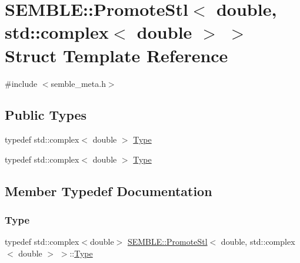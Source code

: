 \hypertarget{structSEMBLE_1_1PromoteStl_3_01double_00_01std_1_1complex_3_01double_01_4_01_4}{}\section{S\+E\+M\+B\+LE\+:\+:Promote\+Stl$<$ double, std\+:\+:complex$<$ double $>$ $>$ Struct Template Reference}
\label{structSEMBLE_1_1PromoteStl_3_01double_00_01std_1_1complex_3_01double_01_4_01_4}


{\ttfamily \#include $<$semble\+\_\+meta.\+h$>$}

\subsection*{Public Types}
\begin{DoxyCompactItemize}
\item 
typedef std\+::complex$<$ double $>$ \mbox{\hyperlink{structSEMBLE_1_1PromoteStl_3_01double_00_01std_1_1complex_3_01double_01_4_01_4_a941bd5815d06151138c394c3272c285e}{Type}}
\item 
typedef std\+::complex$<$ double $>$ \mbox{\hyperlink{structSEMBLE_1_1PromoteStl_3_01double_00_01std_1_1complex_3_01double_01_4_01_4_a941bd5815d06151138c394c3272c285e}{Type}}
\end{DoxyCompactItemize}


\subsection{Member Typedef Documentation}
\mbox{\label{structSEMBLE_1_1PromoteStl_3_01double_00_01std_1_1complex_3_01double_01_4_01_4_a941bd5815d06151138c394c3272c285e}} 
\subsubsection{\texorpdfstring{Type}{Type}\hspace{0.1cm}{\footnotesize\ttfamily [1/2]}}
{\footnotesize\ttfamily typedef std\+::complex$<$double$>$ \mbox{\hyperlink{structSEMBLE_1_1PromoteStl}{S\+E\+M\+B\+L\+E\+::\+Promote\+Stl}}$<$ double, std\+::complex$<$ double $>$ $>$\+::\mbox{\hyperlink{structSEMBLE_1_1PromoteStl_3_01double_00_01std_1_1complex_3_01double_01_4_01_4_a941bd5815d06151138c394c3272c285e}{Type}}}

